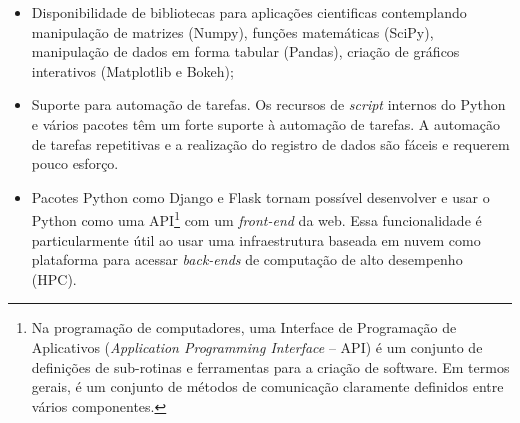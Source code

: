 \begin{itemize}
    \item Disponibilidade de bibliotecas para aplicações cientificas contemplando manipulação de matrizes (Numpy), funções matemáticas (SciPy), manipulação de dados em forma tabular (Pandas), criação de gráficos interativos (Matplotlib e Bokeh);

    \item Suporte para automação de tarefas. Os recursos de \textit{script} internos do Python e vários pacotes têm um forte suporte à automação de tarefas. A automação de tarefas repetitivas e a realização do registro de dados são fáceis e requerem pouco esforço.

    \item Pacotes Python como Django e Flask tornam possível desenvolver e usar o Python como uma API\footnote{Na programação de computadores, uma Interface de Programação de Aplicativos (\textit{Application Programming Interface} -- API) é um conjunto de definições de sub-rotinas e ferramentas para a criação de software. Em termos gerais, é um conjunto de métodos de comunicação claramente definidos entre vários componentes.} com um \textit{front-end} da web. Essa funcionalidade é particularmente útil ao usar uma infraestrutura baseada em nuvem como plataforma para acessar \textit{back-ends} de computação de alto desempenho (HPC).
\end{itemize}
